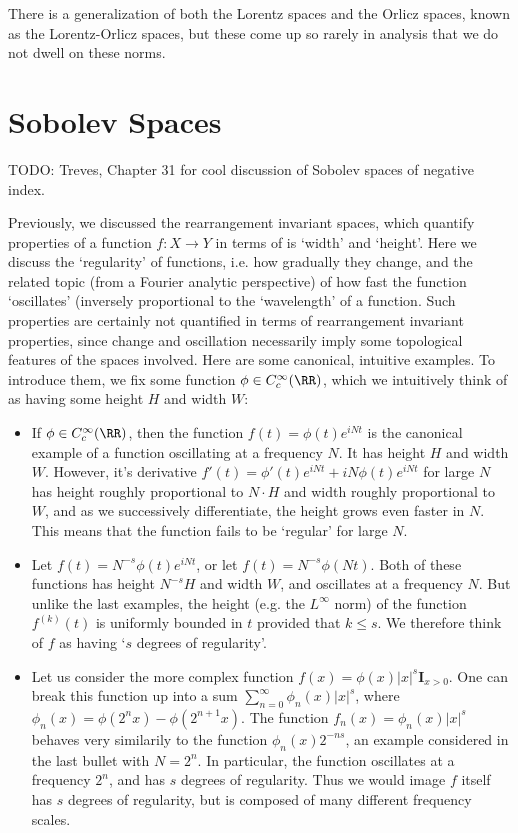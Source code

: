 There is a generalization of both the Lorentz spaces and the Orlicz spaces, known as the Lorentz-Orlicz spaces, but these come up so rarely in analysis that we do not dwell on these norms.












\chapter{Sobolev Spaces}

TODO: Treves, Chapter 31 for cool discussion of Sobolev spaces of negative index.

Previously, we discussed the rearrangement invariant spaces, which quantify properties of a function $f: X \to Y$ in terms of is `width' and `height'. Here we discuss the `regularity' of functions, i.e. how gradually they change, and the related topic (from a Fourier analytic perspective) of how fast the function `oscillates' (inversely proportional to the `wavelength' of a function. Such properties are certainly not quantified in terms of rearrangement invariant properties, since change and oscillation necessarily imply some topological features of the spaces involved. Here are some canonical, intuitive examples. To introduce them, we fix some function $\phi \in C_c^\infty(\RR)$, which we intuitively think of as having some height $H$ and width $W$:
%
\begin{itemize}
    \item If $\phi \in C_c^\infty(\RR)$, then the function $f(t) = \phi(t) e^{iNt}$ is the canonical example of a function oscillating at a frequency $N$. It has height $H$ and width $W$. However, it's derivative $f'(t) = \phi'(t) e^{iNt} + iN \phi(t) e^{iNt}$ for large $N$ has height roughly proportional to $N \cdot H$ and width roughly proportional to $W$, and as we successively differentiate, the height grows even faster in $N$. This means that the function fails to be `regular' for large $N$.

    \item Let $f(t) = N^{-s} \phi(t) e^{iNt}$, or let $f(t) = N^{-s} \phi(Nt)$. Both of these functions has height $N^{-s} H$ and width $W$, and oscillates at a frequency $N$. But unlike the last examples, the height (e.g. the $L^\infty$ norm) of the function $f^{(k)}(t)$ is uniformly bounded in $t$ provided that $k \leq s$. We therefore think of $f$ as having `$s$ degrees of regularity'.

    \item Let us consider the more complex function $f(x) = \phi(x) |x|^s \mathbf{I}_{x > 0}$. One can break this function up into a sum $\sum_{n = 0}^\infty \phi_n(x) |x|^s$, where $\phi_n(x) = \phi(2^n x) - \phi(2^{n+1} x)$. The function $f_n(x) = \phi_n(x) |x|^s$ behaves very similarily to the function $\phi_n(x) 2^{-ns}$, an example considered in the last bullet with $N = 2^n$. In particular, the function oscillates at a frequency $2^n$, and has $s$ degrees of regularity. Thus we would image $f$ itself has $s$ degrees of regularity, but is composed of many different frequency scales.
\end{itemize}
